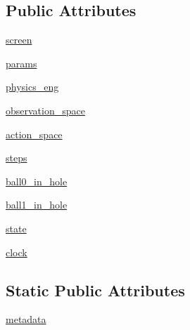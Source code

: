 \subsection*{Public Attributes}
\begin{DoxyCompactItemize}
\item 
\hyperlink{classtaxons_1_1gym__billiard_1_1envs_1_1billiard__hard__env_1_1_billiard_hard_env_ad9edc447277b974c535bff0e27ef09c2}{screen}
\item 
\hyperlink{classtaxons_1_1gym__billiard_1_1envs_1_1billiard__hard__env_1_1_billiard_hard_env_a5e6de428900fdc0096bae8f9f9e767b6}{params}
\item 
\hyperlink{classtaxons_1_1gym__billiard_1_1envs_1_1billiard__hard__env_1_1_billiard_hard_env_ae10d418814185df55aecbf05cab938bc}{physics\+\_\+eng}
\item 
\hyperlink{classtaxons_1_1gym__billiard_1_1envs_1_1billiard__hard__env_1_1_billiard_hard_env_a111f7fd9e970856a11960697b759f99f}{observation\+\_\+space}
\item 
\hyperlink{classtaxons_1_1gym__billiard_1_1envs_1_1billiard__hard__env_1_1_billiard_hard_env_a7b5624d285ec8b5f87d334aef006d535}{action\+\_\+space}
\item 
\hyperlink{classtaxons_1_1gym__billiard_1_1envs_1_1billiard__hard__env_1_1_billiard_hard_env_aafc9b80b6cfa4a2e6fd14716f337faf0}{steps}
\item 
\hyperlink{classtaxons_1_1gym__billiard_1_1envs_1_1billiard__hard__env_1_1_billiard_hard_env_abb6da2f5369080cabeea994b29176535}{ball0\+\_\+in\+\_\+hole}
\item 
\hyperlink{classtaxons_1_1gym__billiard_1_1envs_1_1billiard__hard__env_1_1_billiard_hard_env_ad3ae97c2f90a72fd05d5065b190f5af6}{ball1\+\_\+in\+\_\+hole}
\item 
\hyperlink{classtaxons_1_1gym__billiard_1_1envs_1_1billiard__hard__env_1_1_billiard_hard_env_a231f5b5852af7af5a4faedabe128a57f}{state}
\item 
\hyperlink{classtaxons_1_1gym__billiard_1_1envs_1_1billiard__hard__env_1_1_billiard_hard_env_a2b8575d26433667b841d2e21297f7c38}{clock}
\end{DoxyCompactItemize}
\subsection*{Static Public Attributes}
\begin{DoxyCompactItemize}
\item 
\hyperlink{classtaxons_1_1gym__billiard_1_1envs_1_1billiard__hard__env_1_1_billiard_hard_env_a679621ec261c78dd7e1fc9a21703a57c}{metadata}
\end{DoxyCompactItemize}


